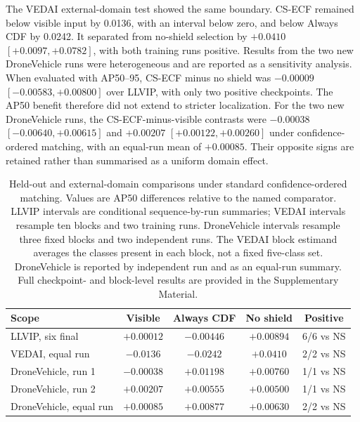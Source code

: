 \documentclass[preprint,11pt]{elsarticle}
\begin{document}
The VEDAI external-domain test showed the same boundary. CS-ECF remained below
visible input by 0.0136, with an interval below zero, and below Always CDF by
0.0242. It separated from no-shield selection by \(+0.0410\)
\([+0.0097,+0.0782]\), with both training runs positive. Results from the two
new DroneVehicle runs were heterogeneous and are reported as a sensitivity
analysis. When evaluated with AP50--95, CS-ECF minus no shield was \(-0.00009\)
\([-0.00583,+0.00800]\) over LLVIP, with only two positive checkpoints. The
AP50 benefit therefore did not extend to stricter localization. For the two
new DroneVehicle runs, the CS-ECF-minus-visible contrasts were \(-0.00038\)
\([-0.00640,+0.00615]\) and \(+0.00207\) \([+0.00122,+0.00260]\) under
confidence-ordered matching, with an equal-run mean of \(+0.00085\). Their
opposite signs are retained rather than summarised as a uniform domain effect.

\begin{table}[t]
\centering
\small
\setlength{\tabcolsep}{3pt}
\caption{Held-out and external-domain comparisons under standard
confidence-ordered matching. Values are AP50 differences relative to the named
comparator. LLVIP intervals are conditional sequence-by-run summaries; VEDAI
intervals resample ten blocks and two training runs. DroneVehicle intervals
resample three fixed blocks and two independent runs. The VEDAI block
estimand averages the classes present in each block, not a fixed five-class
set. DroneVehicle is reported by independent run and as an equal-run summary.
Full checkpoint- and block-level results are provided in the Supplementary
Material.}
\label{tab:main-comparison}
\begin{tabular}{@{}lcccc@{}}
\toprule
Scope & Visible & Always CDF & No shield & Positive \\
\midrule
LLVIP, six final & \(+0.00012\) & \(-0.00446\) & \(+0.00894\) & 6/6 vs NS \\
VEDAI, equal run & \(-0.0136\) & \(-0.0242\) & \(+0.0410\) & 2/2 vs NS \\
DroneVehicle, run 1 & \(-0.00038\) & \(+0.01198\) & \(+0.00760\) &
1/1 vs NS \\
DroneVehicle, run 2 & \(+0.00207\) & \(+0.00555\) & \(+0.00500\) &
1/1 vs NS \\
DroneVehicle, equal run & \(+0.00085\) & \(+0.00877\) & \(+0.00630\) &
2/2 vs NS \\
\bottomrule
\end{tabular}
\end{table}
\end{document}

